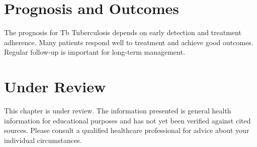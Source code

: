 \section*{Prognosis and Outcomes}
The prognosis for Tb Tuberculosis depends on early detection and treatment adherence. Many patients respond well to treatment and achieve good outcomes. Regular follow-up is important for long-term management.
\section*{Under Review}
This chapter is under review. The information presented is general health information for educational purposes and has not yet been verified against cited sources. Please consult a qualified healthcare professional for advice about your individual circumstances.


\clearpage
